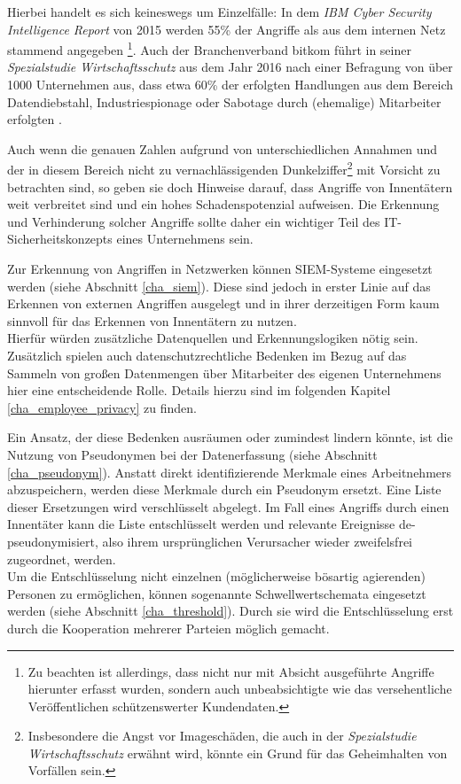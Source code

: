 Hierbei handelt es sich keineswegs um Einzelfälle:
In dem \textit{IBM Cyber Security Intelligence Report} von 2015 werden 55\% der Angriffe als aus dem internen Netz stammend angegeben \cite{ibm2015}\footnote{
  Zu beachten ist allerdings, dass nicht nur mit Absicht ausgeführte Angriffe hierunter erfasst wurden, sondern auch unbeabsichtigte wie das versehentliche Veröffentlichen schützenswerter Kundendaten.
}.
Auch der Branchenverband bitkom führt in seiner \textit{Spezialstudie Wirtschaftsschutz} aus dem Jahr 2016 nach einer Befragung von über 1000 Unternehmen aus, dass etwa 60\% der erfolgten Handlungen aus dem Bereich Datendiebstahl, Industriespionage oder Sabotage durch (ehemalige) Mitarbeiter erfolgten \cite{bitkom2016}.


Auch wenn die genauen Zahlen aufgrund von unterschiedlichen Annahmen und der in diesem Bereich nicht zu vernachlässigenden Dunkelziffer\footnote{
	Insbesondere die Angst vor Imageschäden, die auch in der \textit{Spezialstudie Wirtschaftsschutz} erwähnt wird, könnte ein Grund für das Geheimhalten von Vorfällen sein.
} mit Vorsicht zu betrachten sind, so geben sie doch Hinweise darauf, dass Angriffe von Innentätern weit verbreitet sind und ein hohes Schadenspotenzial aufweisen. Die Erkennung und Verhinderung solcher Angriffe sollte daher ein wichtiger Teil des IT-Sicherheitskonzepts eines Unternehmens sein.

Zur Erkennung von Angriffen in Netzwerken können SIEM-Systeme eingesetzt werden (siehe Abschnitt \ref{cha_siem}). Diese sind jedoch in erster Linie auf das Erkennen von externen Angriffen ausgelegt und in ihrer derzeitigen Form kaum sinnvoll für das Erkennen von Innentätern zu nutzen.  \\
Hierfür würden zusätzliche Datenquellen und Erkennungslogiken nötig sein. 
Zusätzlich spielen auch  datenschutzrechtliche Bedenken im Bezug auf das Sammeln von großen Datenmengen über Mitarbeiter des eigenen Unternehmens hier eine entscheidende Rolle. Details hierzu sind im folgenden Kapitel \ref{cha_employee_privacy} zu finden.

Ein Ansatz, der diese Bedenken ausräumen oder zumindest lindern könnte, ist die Nutzung von Pseudonymen bei der Datenerfassung (siehe Abschnitt \ref{cha_pseudonym}). Anstatt direkt identifizierende Merkmale eines Arbeitnehmers abzuspeichern, werden diese Merkmale durch ein Pseudonym ersetzt. Eine Liste dieser Ersetzungen wird verschlüsselt abgelegt. Im Fall eines Angriffs durch einen Innentäter kann die Liste entschlüsselt werden und relevante Ereignisse de-pseudonymisiert, also ihrem ursprünglichen Verursacher wieder zweifelsfrei zugeordnet, werden.\\
Um die Entschlüsselung nicht einzelnen (möglicherweise bösartig agierenden) Personen zu ermöglichen, können sogenannte Schwellwertschemata eingesetzt werden (siehe Abschnitt \ref{cha_threshold}). Durch sie wird die Entschlüsselung erst durch die Kooperation mehrerer Parteien möglich gemacht.


